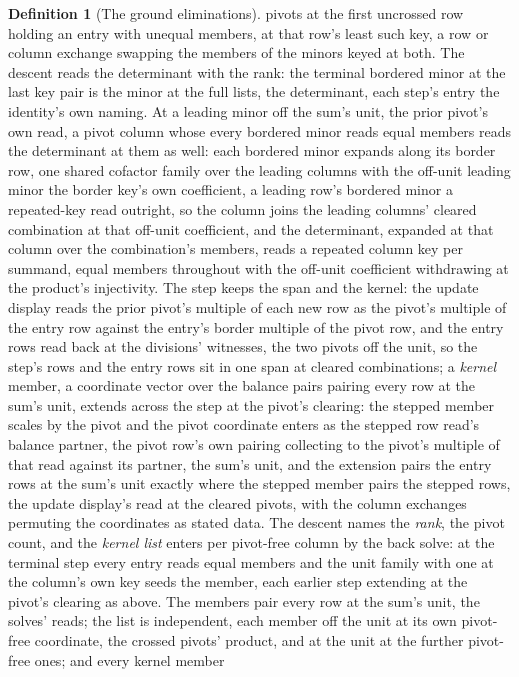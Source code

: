 \documentclass[11pt]{article}
\theoremstyle{definition}
\newtheorem{definition}{Definition}
\begin{document}
\begin{definition}[The ground eliminations]
pivots at the first uncrossed row holding an entry with unequal
members, at that row's least such key, a row or column exchange
swapping the members of the minors keyed at both. The descent
reads the determinant with the rank: the terminal bordered minor
at the last key pair is the minor at the full lists, the
determinant, each step's entry the identity's own naming. At a
leading minor off the sum's unit, the prior pivot's own read, a
pivot column whose every bordered minor reads equal members reads
the determinant at them as well: each
bordered minor expands along its border row, one shared cofactor
family over the leading columns with the off-unit leading minor
the border key's own coefficient, a leading row's bordered minor
a repeated-key read outright, so the column joins the leading
columns' cleared combination at that off-unit coefficient, and
the determinant, expanded at that column over the combination's
members, reads a repeated column key per summand, equal members
throughout with the off-unit coefficient withdrawing at the
product's injectivity. The step keeps
the span and the kernel: the update display reads the prior
pivot's multiple of each new row as the pivot's multiple of the
entry row against the entry's border multiple of the pivot row,
and the entry rows read back at the divisions' witnesses, the
two pivots off the unit, so the step's rows and the entry rows
sit in one span at cleared combinations; a \emph{kernel} member,
a coordinate vector over the balance pairs pairing every row at
the sum's unit, extends across the step at the pivot's clearing:
the stepped member scales by the pivot and the pivot coordinate
enters as the stepped row read's balance partner, the pivot
row's own pairing collecting to the pivot's multiple of that
read against its partner, the sum's unit, and the extension
pairs the entry rows at the sum's unit exactly where the stepped
member pairs the stepped rows, the update display's read at the
cleared pivots, with the column exchanges permuting the
coordinates as stated data. The descent
names the \emph{rank}, the pivot count, and the \emph{kernel
list} enters per pivot-free column by the back solve: at the
terminal step every entry reads equal members and the unit
family with one at the column's own key seeds the member, each
earlier step extending at the pivot's clearing as above. The
members pair every row at the sum's unit, the solves' reads; the
list is independent, each member off the unit at its own
pivot-free coordinate, the crossed pivots' product, and at the
unit at the further pivot-free ones; and every kernel member

\end{definition}
\end{document}
